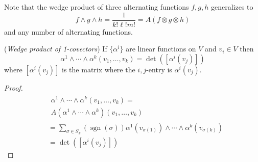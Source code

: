 Note that the wedge product of three alternating functions \(f,g,h\) generalizes to 
\begin{equation}
    f \wedge g \wedge h = \frac{1}{k!\ell!m!} = A(f\otimes g \otimes h)
\end{equation}
and any number of alternating functions.

\begin{proposition}{}{}
    (\textit{Wedge product of 1-covectors}) If \(\{\alpha^i\}\) are linear functions on \(V\) and \(v_i \in V\) then 
    \begin{equation}
        \alpha^1 \wedge \cdots \wedge \alpha^k (v_1, \dots, v_k) = \det([\alpha^i(v_j)])
    \end{equation}
    where \([\alpha^i(v_j)]\) is the matrix where the \(i,j\)-entry is \(\alpha^i(v_j)\).
\end{proposition}

\begin{proof}
    \begin{align}
        &\begin{multlined}
        \alpha^1 \wedge \cdots \wedge \alpha^k (v_1, \dots, v_k) = \\  
        A(\alpha^1 \wedge \cdots \wedge \alpha^k) (v_1, \dots, v_k)
        \end{multlined} \\
        &= \sum_{\sigma \in S_k} (\operatorname{sgn}(\sigma)) \alpha^1 (v_{\sigma(1)}) \wedge \cdots \wedge \alpha^k (v_{\sigma(k)}) \\ 
        &= \det([\alpha^i(v_j)])
    \end{align}
\end{proof}

